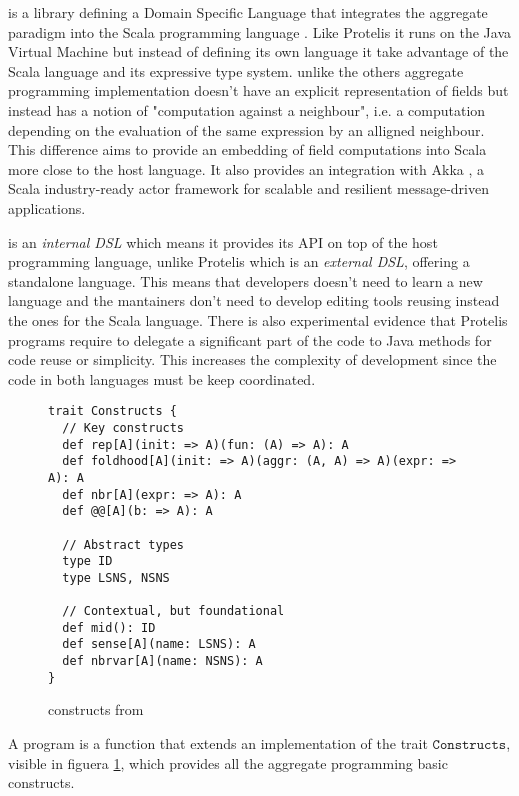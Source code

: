 \Scafi{} \cite{ScafiFirst, Scafi} is a library defining a Domain Specific Language that integrates the aggregate paradigm into the Scala programming language \cite{Scala}. Like Protelis it runs on the Java Virtual Machine but instead of defining its own language it take advantage of the Scala language and its expressive type system. \Scafi{} unlike the others aggregate programming implementation doesn't have an explicit representation of fields but instead has a notion of "computation against a neighbour", i.e. a computation depending on the evaluation of the same expression by an alligned neighbour. This difference aims to provide an embedding of field computations into Scala more close to the host language. It also provides an integration with Akka \cite{Akka}, a Scala industry-ready actor framework for scalable and resilient message-driven applications.

\Scafi{} is an \textit{internal DSL} which means it provides its API on top of the host programming language, unlike Protelis which is an \textit{external DSL}, offering a standalone language. This means that developers doesn't need to learn a new language and the \Scafi{} mantainers don't need to develop editing tools reusing instead the ones for the Scala language. There is also experimental evidence that Protelis programs require to delegate a significant part of the code to Java methods for code reuse or simplicity. This increases the complexity of development since the code in both languages must be keep coordinated.

\begin{figure}[t]
\begin{lstlisting}[language={scafi},frame=single]
trait Constructs {
  // Key constructs
  def rep[A](init: => A)(fun: (A) => A): A
  def foldhood[A](init: => A)(aggr: (A, A) => A)(expr: => A): A
  def nbr[A](expr: => A): A
  def @@[A](b: => A): A

  // Abstract types
  type ID
  type LSNS, NSNS

  // Contextual, but foundational
  def mid(): ID
  def sense[A](name: LSNS): A
  def nbrvar[A](name: NSNS): A
}
\end{lstlisting}
\caption{\Scafi{} constructs from \cite{Scafi}}\label{fig:scaficonstructs}
\end{figure}

A \Scafi{} program is a function that extends an implementation of the trait $\mathtt{Constructs}$, visible in figuera \ref{fig:scaficonstructs}, which provides all the aggregate programming basic constructs. 

